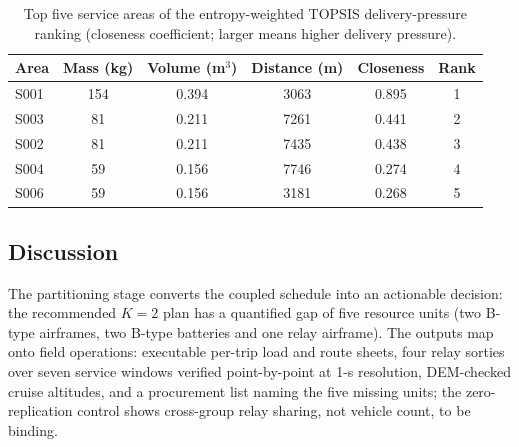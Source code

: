 \documentclass[journal]{IEEEtran}
\begin{document}
\begin{table}[t]
\centering
\footnotesize
\setlength{\tabcolsep}{3pt}
\caption{Top five service areas of the entropy-weighted TOPSIS delivery-pressure
ranking (closeness coefficient; larger means higher delivery pressure).}
\label{tab:topsis}
\begin{tabular}{lccccc}
\toprule
Area & Mass (kg) & Volume (m$^3$) & Distance (m) & Closeness & Rank \\
\midrule
S001 & 154 & 0.394 & 3063 & 0.895 & 1 \\
S003 & 81 & 0.211 & 7261 & 0.441 & 2 \\
S002 & 81 & 0.211 & 7435 & 0.438 & 3 \\
S004 & 59 & 0.156 & 7746 & 0.274 & 4 \\
S006 & 59 & 0.156 & 3181 & 0.268 & 5 \\
\bottomrule
\end{tabular}
\end{table}

\subsection{Discussion}
The partitioning stage converts the coupled schedule into an actionable
decision: the recommended $K{=}2$ plan has a quantified gap of five resource
units (two B-type airframes, two B-type batteries and one relay airframe). The
outputs map onto field operations: executable per-trip load and route sheets,
four relay sorties over seven service windows verified point-by-point at 1-s
resolution, DEM-checked cruise altitudes, and a
procurement list naming the five missing units; the zero-replication control
shows cross-group relay sharing, not vehicle count, to be binding.
\end{document}
